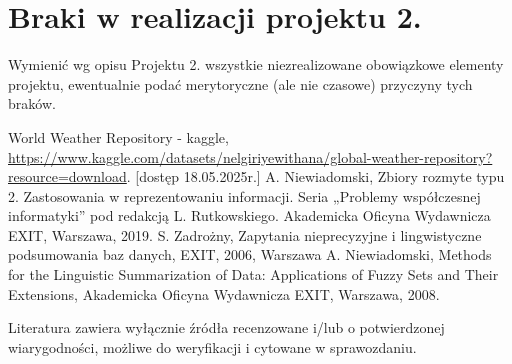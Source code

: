 \documentclass{article}
\begin{document}
\section{Braki w realizacji projektu 2.}
Wymienić wg opisu Projektu 2. wszystkie niezrealizowane obowiązkowe elementy projektu, ewentualnie
podać merytoryczne (ale nie czasowe) przyczyny tych braków. 


\begin{thebibliography}{99}
 World Weather Repository - kaggle, \url{https://www.kaggle.com/datasets/nelgiriyewithana/global-weather-repository?resource=download}. [dostęp 18.05.2025r.]
  A. Niewiadomski, Zbiory rozmyte typu 2. Zastosowania w reprezentowaniu informacji.  Seria „Problemy współczesnej informatyki” pod redakcją L. Rutkowskiego. Akademicka Oficyna Wydawnicza EXIT, Warszawa, 2019.
 S. Zadrożny, Zapytania nieprecyzyjne i lingwistyczne podsumowania baz danych, EXIT, 2006, Warszawa
 A. Niewiadomski, Methods for the Linguistic Summarization of Data: Applications of Fuzzy Sets and Their Extensions, Akademicka Oficyna Wydawnicza EXIT, Warszawa, 2008.
\end{thebibliography}

Literatura zawiera wyłącznie źródła recenzowane i/lub o potwierdzonej wiarygodności,
możliwe do weryfikacji i cytowane w sprawozdaniu. 
\end{document}
